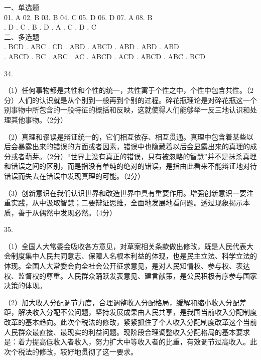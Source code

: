 \documentclass[a4paper]{article}
\begin{document}
\begin{tabbing}
一、单选题\\
\= 01. A \qquad \= 02. B \qquad \= 03. B \qquad \= 04. C \qquad \= 05. D \qquad \= 06. D \qquad \= 07. A \qquad \= 08. B \qquad \=\\
. D . C . B . D . A . C . D . C \\
二、多选题\\
. BCD  . ABC  . CD   . ABD  . ABCD . ABD  . ABD  . ABD  \\
. ABCD . BC   . ABC  . AC   . ABCD . ACD  . ABCD . ABC  . BCD
\end{tabbing}

34.

（1）任何事物都是共性和个性的统一，共性寓于个性之中，个性中包含共性。（2分）人们的认识就是从个别到一般再到个别的过程。碎花瓶理论是对碎花瓶这一个别事物中所包含的一般特征的概括和反映，这就使得人们能够举一反三地认识和处理其他事物。（2分）

（2）真理和谬误是辩证统一的，它们相互依存、相互贯通。真理中包含着某些以后会暴露出来的错误的方面或者因素，错误中也隐藏着以后会显露出来的真理的成分或者萌芽。（2分）“世界上没有真正的错误，只有被忽略的智慧”并不是抹杀真理和错误之间的区别，而是指没有单纯的绝对的错误，是指由此看来不能辩证地对待错误而失去在错误中发现真理的可能。（2分）

（3）创新意识在我们认识世界和改造世界中具有重要作用。增强创新意识一要注重实践，从中汲取智慧；二要辩证思维，全面地发展地看问题。透过现象揭示本质，善于从偶然中发现必然。（4分）

35.

（1）全国人大常委会吸收各方意见，对草案相关条款做出修改，既是人民代表大会制度集中人民共同意志、保障人名根本利益的体现，也是民主立法、科学立法的体现。全国人大常委会向全社会公开征求意见，是对人民知情权、参与权、表达权、监督权的尊重。人民群众踊跃发表意见、建言献策，是公民积极有序参与国家决策的体现。

（2）加大收入分配调节力度，合理调整收入分配格局，缓解和缩小收入分配差距，解决收入分配不公问题，坚持发展成果由人民共享，是我国当前收入分配制度改革的基本趋向。此次个税法的修改，紧紧抓住了个人收入分配制度改革这个当前人民群众最直接、最现实的利益问题。现阶段合理调整收入分配格局的基本要求是：着力提高低收入者收入，努力扩大中等收入者的比重，有效调节过高收入。此次个税法的修改，较好地贯彻了这一要求。
\end{document}
